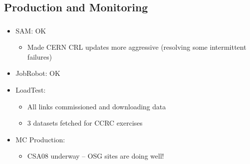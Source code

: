 \documentclass{beamer}
\begin{document}
\subsection{Production and Monitoring}
\begin{frame}
\frametitle{}
\begin{itemize}
    \item SAM: OK
    \begin{itemize}
        \item Made CERN CRL updates more aggressive (resolving some intermittent failures)
    \end{itemize}
    \item JobRobot: OK 
    \item LoadTest:
    \begin{itemize}
        \item All links commissioned and downloading data
        \item 3 datasets fetched for CCRC exercises
    \end{itemize}
    \item MC Production:
    \begin{itemize}
        \item CSA08 underway -- OSG sites are doing well!
    \end{itemize}
\end{itemize}
\end{frame}
\end{document}

